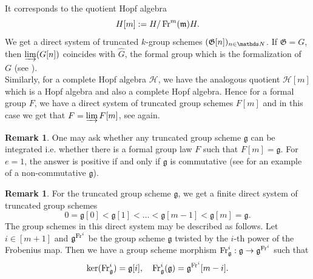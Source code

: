 \documentclass[10pt]{amsart}
\theoremstyle{definition}
\newtheorem{remark}[theorem]{Remark}
\begin{document}
It corresponds to the quotient Hopf algebra $$H[m]:=H/\operatorname{Fr}^m(\mathfrak{m})H.$$
We get a direct system of truncated $k$-group schemes $(\mathfrak{G}[n])_{n\in \Nn}$. If $\mathfrak{G}=G$, then $\operatorname{\underrightarrow{\lim}}(G[n])$ coincides with $\widehat{G}$, the formal group which is the formalization of $G$ (see \cite[Lemma 1.1]{Manin}).
\\
Similarly, for a complete Hopf algebra $\mathcal{H}$, we have the analogous quotient $\mathcal{H}[m]$ which is a Hopf algebra and also a complete Hopf algebra. Hence for a formal group $F$, we have a direct system of truncated group schemes $F[m]$ and in this case we get that $F=\operatorname{\underrightarrow{\lim}} F[m]$, see \cite[Lemma 1.1]{Manin} again.
\begin{remark}\label{intgs}
One may ask whether any truncated group scheme $\mathfrak{g}$ can be integrated i.e. whether there is a formal group law $F$ such that $F[m]=\mathfrak{g}$. For $e=1$, the answer is positive if and only if $\mathfrak{g}$ is commutative \cite[Corollary 5.7.4]{Hazew} (see \cite[Example 5.7.8]{Hazew} for an example of a non-commutative $\mathfrak{g}$).
\end{remark}
\begin{remark}\label{gm}
For the truncated group scheme $\mathfrak{g}$, we get a finite direct system of truncated group schemes
$$0=\mathfrak{g}[0]<\mathfrak{g}[1]<\ldots <\mathfrak{g}[m-1]<\mathfrak{g}[m]=\mathfrak{g}.$$
The group schemes in this direct system may be described as follows. Let $i\in [m+1]$ and $\mathfrak{g}^{\operatorname{Fr}^i}$ be the group scheme $\mathfrak{g}$ twisted
by the $i$-th power of the Frobenius map. Then we have a group scheme morphism $\operatorname{Fr}_{\mathfrak{g}}^i:\mathfrak{g}\to \mathfrak{g}^{\operatorname{Fr}^i}$ such that
$$\ker(\fr_{\mathfrak{g}}^i)=\mathfrak{g}[i],\ \ \ \fr_{\mathfrak{g}}^i(\mathfrak{g})=\mathfrak{g}^{\fr^i}[m-i].$$
\end{remark}
\end{document}
